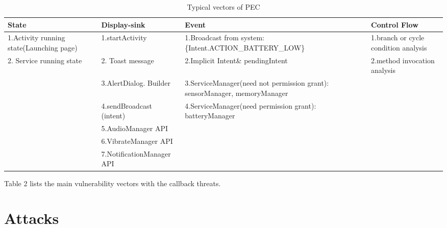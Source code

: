 \documentclass{sig-alternate-05-2015}
\begin{document}
\begin{table}[htbp]
\centering
 \caption{\label{tab:test} Typical vectors of PEC}
 \begin{tabularx}{\linewidth}{XXXX}

  \toprule
  State & Display-sink & Event & Control Flow \\
  \midrule
 1.Activity running state(Launching page) & 1.startActivity & 1.Broadcast from system: \{Intent.ACTION\_BATTERY\_LOW\} & 1.branch or cycle condition analysis \\
  2. Service running state &2. Toast message & 2.Implicit Intent\& pendingIntent & 2.method invocation analysis\\
     & 3.AlertDialog. Builder & 3.ServiceManager(need not permission grant): { sensorManager, memoryManager }\\
     & 4.sendBroadcast (intent)& 4.ServiceManager(need permission grant): { batteryManager }\\     
     & 5.AudioManager API & \\
     & 6.VibrateManager API & \\
     & 7.NotificationManager API & \\
     
  \bottomrule
 \end{tabularx}
\end{table}



{\color{red}Table 2} lists the main vulnerability vectors with the callback threats. 

\section{Attacks}

\end{document}
